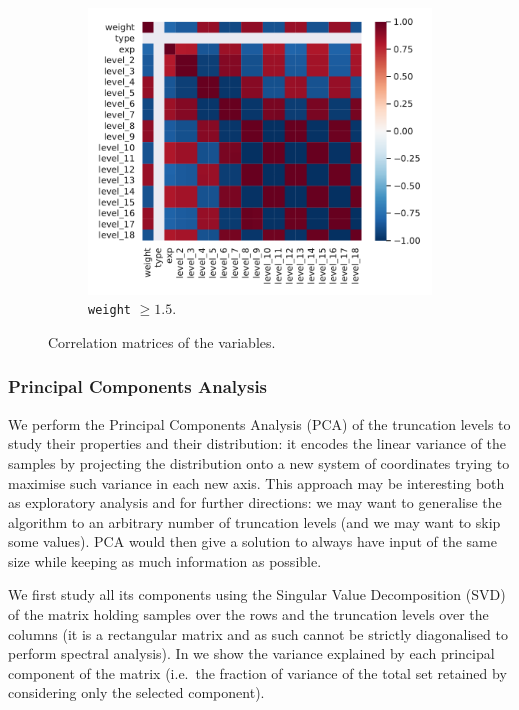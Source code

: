 \begin{figure}[htbp]
  \begin{subfigure}{0.32\textwidth}
    \centering
    \includegraphics[width=\linewidth]{img/corr_mat_high}
    \caption{\texttt{weight} $\ge 1.5$.}
  \end{subfigure}
  \caption{Correlation matrices of the variables.}
  \label{fig:lumps:corr}
\end{figure}


\subsubsection{Principal Components Analysis}

We perform the Principal Components Analysis (PCA) of the truncation levels to study their properties and their distribution: it encodes the linear variance of the samples by projecting the distribution onto a new system of coordinates trying to maximise such variance in each new axis.
This approach may be interesting both as exploratory analysis and for further directions: we may want to generalise the algorithm to an arbitrary number of truncation levels (and we may want to skip some values).
PCA would then give a solution to always have input of the same size while keeping as much information as possible.

We first study all its components using the Singular Value Decomposition (SVD) of the matrix holding samples over the rows and the truncation levels over the columns (it is a rectangular matrix and as such cannot be strictly diagonalised to perform spectral analysis).
In  we show the variance explained by each principal component of the matrix (i.e.\ the fraction of variance of the total set retained by considering only the selected component).


